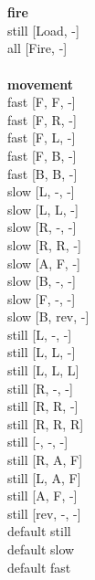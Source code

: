 
\ \\



\ \\ {\bf fire } \\
still [Load, -] \\
all [Fire, -] \\
\ \\ {\bf movement } \\
fast [F, F, -] \\
fast [F, R, -] \\
fast [F, L, -] \\
fast [F, B, -] \\
fast [B, B, -] \\
slow [L, -, -] \\
slow [L, L, -] \\
slow [R, -, -] \\
slow [R, R, -] \\
slow [A, F, -] \\
slow [B, -, -] \\
slow [F, -, -] \\
slow [B, rev, -] \\
still [L, -, -] \\
still [L, L, -] \\
still [L, L, L] \\
still [R, -, -] \\
still [R, R, -] \\
still [R, R, R] \\
still [-, -, -] \\
still [R, A, F] \\
still [L, A, F] \\
still [A, F, -] \\
still [rev, -, -] \\
default still \\
default slow \\
default fast \\


